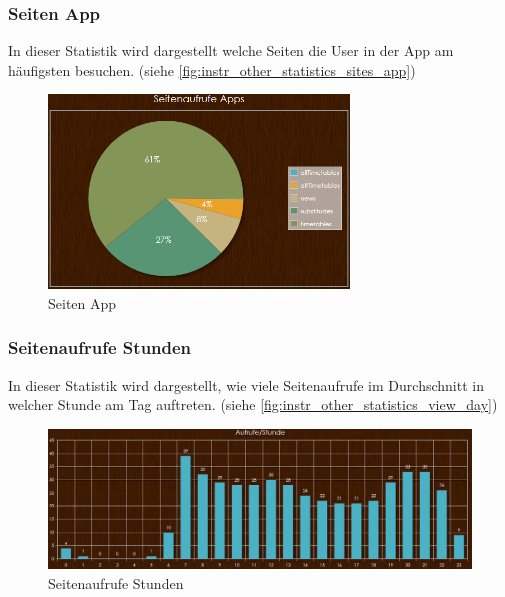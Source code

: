 \subsubsection{Seiten App}
In dieser Statistik wird dargestellt welche Seiten die User in der App am häufigsten besuchen. (siehe \autoref{fig:instr_other_statistics_sites_app})
\begin{figure}[H]
\centering
\includegraphics[keepaspectratio=true, width=8cm]{images/screenshots/statistics_sites_app.png}
\caption{Seiten App}
\label{fig:instr_other_statistics_sites_app}
\end{figure}
\subsubsection{Seitenaufrufe Stunden}
In dieser Statistik wird dargestellt, wie viele Seitenaufrufe im Durchschnitt in welcher Stunde am Tag auftreten. (siehe \autoref{fig:instr_other_statistics_view_day})
\begin{figure}[H]
\centering
\includegraphics[keepaspectratio=true, width=17cm]{images/screenshots/statistics_views_hour.png}
\caption{Seitenaufrufe Stunden}
\label{fig:instr_other_statistics_view_day}
\end{figure}
